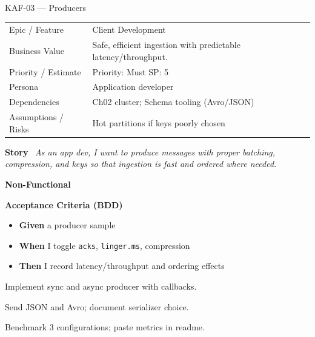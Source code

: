 \documentclass[11pt,a4paper]{article}
\newcommand{\Field}[2]{\textbf{#1}~#2}
\begin{document}
\begin{StoryCardBox}{KAF-03 --- Producers}
\begin{tabularx}{\linewidth}{LY}
 Epic / Feature & Client Development \\
 Business Value & Safe, efficient ingestion with predictable latency/throughput. \\
 Priority / Estimate & Priority: Must \quad SP: 5 \\
 Persona & Application developer \\
 Dependencies & Ch02 cluster; Schema tooling (Avro/JSON) \\
 Assumptions / Risks & Hot partitions if keys poorly chosen \\
\end{tabularx}

\medskip
\Field{Story}{\; \emph{As an app dev, I want to produce messages with proper batching, compression, and keys so that ingestion is fast and ordered where needed.}}

\medskip
\Field{Non-Functional}{\; \; }

\medskip
\Field{Acceptance Criteria (BDD)}{}
\begin{itemize}[leftmargin=1.2em, itemsep=1pt]
  \item \textbf{Given} a producer sample
  \item \textbf{When} I toggle \texttt{acks}, \texttt{linger.ms}, compression
  \item \textbf{Then} I record latency/throughput and ordering effects
\end{itemize}

\begin{TasksBox}
\begin{tasklist}
  \item Implement sync and async producer with callbacks.
  \item Send JSON and Avro; document serializer choice.
  \item Benchmark 3 configurations; paste metrics in readme.
\end{tasklist}
\end{TasksBox}
\end{StoryCardBox}
\clearpage
\end{document}
